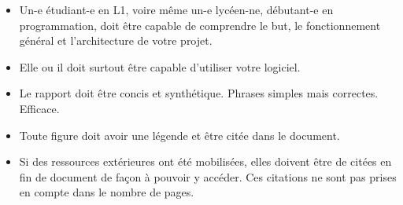 \documentclass[a4paper,12pt]{article}
\begin{document}
\begin{itemize}
\item[$\ast$] Un-e étudiant-e en L1, voire même un-e lycéen-ne, débutant-e en programmation,
doit être capable de comprendre le but, le fonctionnement général et l'architecture de 
votre projet.
\item[$\ast$] Elle ou il doit surtout être capable d'utiliser votre logiciel.
\item[$\ast$] Le rapport doit être concis et synthétique. Phrases simples mais correctes. Efficace.
\item[$\ast$] Toute figure doit avoir une légende et être citée dans le document.
\item[$\ast$] Si des ressources extérieures ont été mobilisées, elles doivent être de citées en fin
de document de façon à pouvoir y accéder.
Ces citations ne sont pas prises en compte dans le nombre de pages.
\end{itemize}
\end{document}
